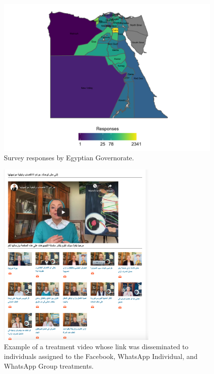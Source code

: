 \documentclass[12pt]{article}
\begin{document}
\begin{figure}[H]
\caption{Survey responses by Egyptian Governorate. \label{fig:map}}
\centerline{\includegraphics[width=1.15\textwidth]{Figures/Other/map_plot.pdf}}

\end{figure}


\begin{figure}[H]
\caption{Example of a treatment video whose link was disseminated to individuals assigned to the Facebook, WhatsApp Individual, and WhatsApp Group treatments.}
\centerline{\includegraphics[width=0.7\textwidth,  keepaspectratio, clip=true, trim = 30 50 30 30]{Figures/Other/v6wg.png}}

\label{fig:mshlwa7dek.org}
\end{figure}
\end{document}
